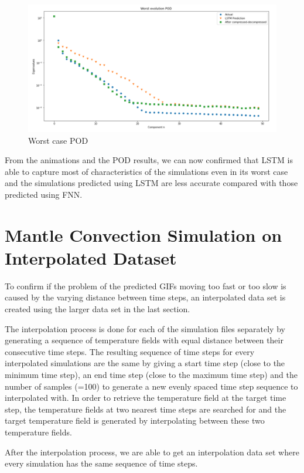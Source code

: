 \begin{figure}[H]
    \caption{Worst case POD}
    \includegraphics[scale=0.5]{Report LaTeX/figures/mantle_convection_images/larger_dataset/LSTM_Worst_POD.png}
\end{figure}

From the animations and the POD results, we can now confirmed that LSTM is able to capture most of characteristics of the simulations even in its worst case and the simulations predicted using LSTM are less accurate compared with those predicted using FNN.


\section{Mantle Convection Simulation on Interpolated Dataset}

To confirm if the problem of the predicted GIFs moving too fast or too slow is caused by the varying distance between time steps, an interpolated data set is created using the larger data set in the last section.

The interpolation process is done for each of the simulation files separately by generating a sequence of temperature fields with equal distance between their consecutive time steps. The resulting sequence of time steps for every interpolated simulations are the same by giving a start time step (close to the minimum time step), an end time step (close to the maximum time step) and the number of samples (=100) to generate a new evenly spaced time step sequence to interpolated with. In order to retrieve the temperature field at the target time step, the temperature fields at two nearest time steps are searched for  and the target temperature field is generated by interpolating between these two temperature fields.

After the interpolation process, we are able to get an interpolation data set where every simulation has the same sequence of time steps.

